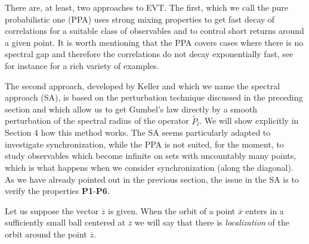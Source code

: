 \documentclass[12pt,reqno,a4paper]{amsart}
\newcommand{\pg}{\textcolor{red}}
\let\tilde\widetilde
\begin{document}

 There are, at least, two approaches to EVT. The first, which we
 call the pure probabilistic one (PPA) uses strong mixing properties to  get  fast decay of correlations for a suitable class of observables and to control short returns around a given point. It is worth mentioning  that the PPA covers cases where there is no spectral gap and therefore the   correlations do not decay exponentially fast, see for instance \cite{ERDS} for a rich variety of examples.


The second approach, developed by Keller \cite{KE} and which we name  the spectral approach (SA), is based on the  perturbation technique discussed in the preceding section and which allow us to get Gumbel's law directly by a smooth perturbation of the spectral radius of the operator $\tilde{P_l}$. We will show explicitly in Section 4 how this method works. The SA seems particularly adapted to investigate synchronization, while the PPA is not suited, for the moment, to study observables which become infinite on sets with uncountably many points, which is what happens when we consider synchronization (along the diagonal). As we have already pointed out in the previous section, the issue in the SA is to verify the properties {\bf P1}-{\bf P6}.

 Let us suppose the vector $\overline{z}$ is given. When the orbit of a point  $\overline{x}$ enters in a sufficiently small ball centered at $\overline{z}$ we will say that there is {\em localization} of the orbit around the point $\overline{z}$.
\end{document}
